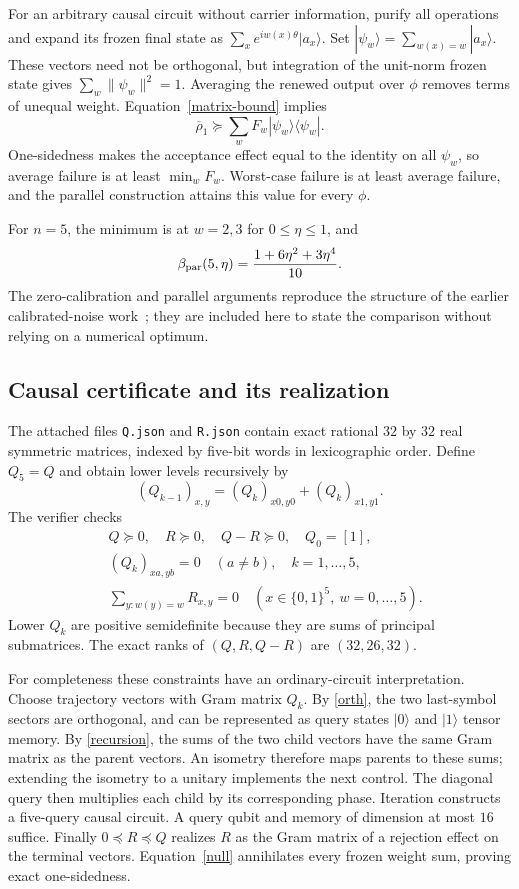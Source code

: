 \documentclass[11pt,a4paper]{article}
\newcommand{\ket}[1]{|#1\rangle}
\newcommand{\bra}[1]{\langle#1|}
\begin{document}
For an arbitrary causal circuit without carrier information, purify all operations and expand its frozen final state as
$\sum_xe^{iw(x)\theta}\ket{a_x}$. Set
$\ket{\psi_w}=\sum_{w(x)=w}\ket{a_x}$.
These vectors need not be orthogonal, but integration of the unit-norm frozen state gives $\sum_w\|\psi_w\|^2=1$.
Averaging the renewed output over $\phi$ removes terms of unequal weight. Equation~\eqref{matrix-bound} implies
\[
 \overline{\rho}_1\succeq \sum_wF_w\ket{\psi_w}\bra{\psi_w}.
\]
One-sidedness makes the acceptance effect equal to the identity on all $\psi_w$, so average failure is at least $\min_wF_w$. Worst-case failure is at least average failure, and the parallel construction attains this value for every $\phi$.

For $n=5$, the minimum is at $w=2,3$ for $0\leq\eta\leq1$, and
\begin{equation}\label{bpar}
 \beta_{\rm par}(5,\eta)=\frac{1+6\eta^2+3\eta^4}{10}.
\end{equation}
The zero-calibration and parallel arguments reproduce the structure of the earlier calibrated-noise work~\cite{prior}; they are included here to state the comparison without relying on a numerical optimum.

\subsection{Causal certificate and its realization}
The attached files \texttt{Q.json} and \texttt{R.json} contain exact rational $32$ by $32$ real symmetric matrices, indexed by five-bit words in lexicographic order. Define $Q_5=Q$ and obtain lower levels recursively by
\begin{equation}\label{recursion}
 (Q_{k-1})_{x,y}=(Q_k)_{x0,y0}+(Q_k)_{x1,y1}.
\end{equation}
The verifier checks
\begin{align}
 &Q\succeq0,\quad R\succeq0,\quad Q-R\succeq0,\quad Q_0=[1],
 \label{psd}\\
 &(Q_k)_{xa,yb}=0\quad(a\ne b),\quad k=1,\ldots,5,
 \label{orth}\\
 &\sum_{y:w(y)=w}R_{x,y}=0\quad(x\in\{0,1\}^5,\ w=0,\ldots,5).
 \label{null}
\end{align}
Lower $Q_k$ are positive semidefinite because they are sums of principal submatrices. The exact ranks of $(Q,R,Q-R)$ are $(32,26,32)$.

For completeness these constraints have an ordinary-circuit interpretation. Choose trajectory vectors with Gram matrix $Q_k$. By \eqref{orth}, the two last-symbol sectors are orthogonal, and can be represented as query states $\ket0$ and $\ket1$ tensor memory. By \eqref{recursion}, the sums of the two child vectors have the same Gram matrix as the parent vectors. An isometry therefore maps parents to these sums; extending the isometry to a unitary implements the next control. The diagonal query then multiplies each child by its corresponding phase. Iteration constructs a five-query causal circuit. A query qubit and memory of dimension at most $16$ suffice. Finally $0\preceq R\preceq Q$ realizes $R$ as the Gram matrix of a rejection effect on the terminal vectors. Equation~\eqref{null} annihilates every frozen weight sum, proving exact one-sidedness.
\end{document}
